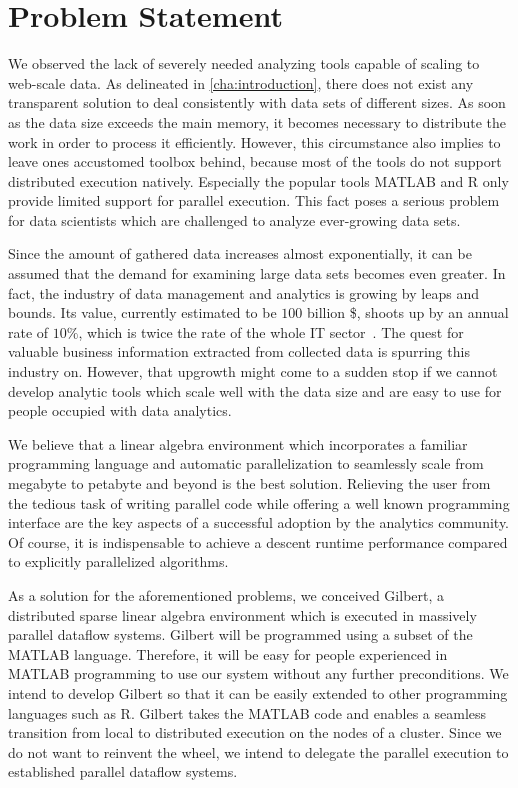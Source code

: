 \chapter{Problem Statement}
\label{cha:problemstatement}


We observed the lack of severely needed analyzing tools capable of scaling to web-scale data.
As delineated in \cref{cha:introduction}, there does not exist any transparent solution to deal consistently with data sets of different sizes.
As soon as the data size exceeds the main memory, it becomes necessary to distribute the work in order to process it efficiently.
However, this circumstance also implies to leave ones accustomed toolbox behind, because most of the tools do not support distributed execution natively.
Especially the popular tools MATLAB and R only provide limited support for parallel execution.
This fact poses a serious problem for data scientists which are challenged to analyze ever-growing data sets.

Since the amount of gathered data increases almost exponentially, it can be assumed that the demand for examining large data sets becomes even greater.
In fact, the industry of data management and analytics is growing by leaps and bounds.
Its value, currently estimated to be $100$ billion \$, shoots up by an annual rate of $10\%$, which is twice the rate of the whole IT sector~\cite{economist}.
The quest for valuable business information extracted from collected data is spurring this industry on.
However, that upgrowth might come to a sudden stop if we cannot develop analytic tools which scale well with the data size and are easy to use for people occupied with data analytics.

We believe that a linear algebra environment which incorporates a familiar programming language and automatic parallelization to seamlessly scale from megabyte to petabyte and beyond is the best solution.
Relieving the user from the tedious task of writing parallel code while offering a well known programming interface are the key aspects of a successful adoption by the analytics community.
Of course, it is indispensable to achieve a descent runtime performance compared to explicitly parallelized algorithms.

As a solution for the aforementioned problems, we conceived Gilbert, a distributed sparse linear algebra environment which is executed in massively parallel dataflow systems.
Gilbert will be programmed using a subset of the MATLAB language.
Therefore, it will be easy for people experienced in MATLAB programming to use our system without any further preconditions.
We intend to develop Gilbert so that it can be easily extended to other programming languages such as R.
Gilbert takes the MATLAB code and enables a seamless transition from local to distributed execution on the nodes of a cluster.
Since we do not want to reinvent the wheel, we intend to delegate the parallel execution to established parallel dataflow systems.


